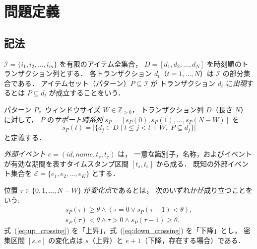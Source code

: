 \section{問題定義}\label{sec:problem}

\subsection{記法}

$\mathcal{I} = \{i_1, i_2, \ldots, i_m\}$ を有限のアイテム全集合，
$D = [d_1, d_2, \ldots, d_N]$ を時刻順のトランザクション列とする．
各トランザクション $d_t$（$t = 1, \ldots, N$）は $\mathcal{I}$ の部分集合である．
アイテムセット（パターン）$P \subseteq \mathcal{I}$ が
トランザクション $d_t$ に\emph{出現}するとは $P \subseteq d_t$ が成立することをいう．

\begin{definition}[サポート時系列]\label{def:support_series}
パターン $P$，ウィンドウサイズ $W \in \mathbb{Z}_{>0}$，
トランザクション列 $D$（長さ $N$）に対して，
$P$ の\emph{サポート時系列} $s_P = [s_P(0), s_P(1), \ldots, s_P(N-W)]$ を
\begin{equation}
s_P(t) = \bigl|\{d_j \in D \mid t \leq j < t + W,\; P \subseteq d_j\}\bigr|
\label{eq:support_series}
\end{equation}
と定義する．
\end{definition}

\begin{definition}[外部イベント]\label{def:event}
\emph{外部イベント} $e = (\textit{id}, \textit{name}, t_s, t_e)$ は，
一意な識別子，名称，およびイベントが有効な期間を表すタイムスタンプ区間 $[t_s, t_e]$ から成る．
既知の外部イベント集合を $\mathcal{E} = \{e_1, e_2, \ldots, e_K\}$ とする．
\end{definition}

\begin{definition}\label{def:change_point}
位置 $\tau \in \{0, 1, \ldots, N-W\}$ が\emph{変化点}であるとは，
次のいずれかが成り立つことをいう:
\begin{align}
s_P(\tau) \geq \theta \land (\tau = 0 \lor s_P(\tau-1) < \theta), \label{eq:up_crossing}\\
s_P(\tau) < \theta \land \tau > 0 \land s_P(\tau-1) \geq \theta. \label{eq:down_crossing}
\end{align}
式~(\ref{eq:up_crossing}) を「上昇」，式~(\ref{eq:down_crossing}) を「下降」とし，
密集区間 $[s, e]$ の変化点は $s$（上昇）と $e+1$（下降，存在する場合）である．
\end{definition}

